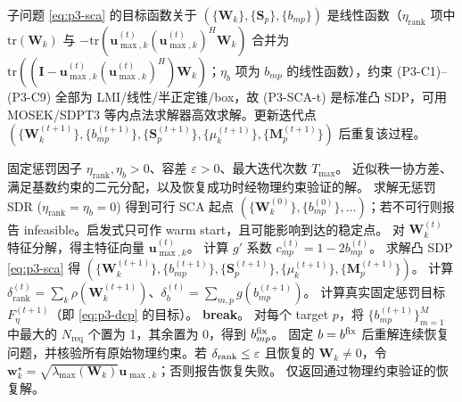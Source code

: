 \documentclass[12pt,a4paper]{article}
\newcommand{\vect}[1]{\mathbf{#1}}
\newcommand{\mat}[1]{\mathbf{#1}}
\newcommand{\tr}{\text{tr}}
\begin{document}
子问题 \eqref{eq:p3-sca} 的目标函数关于 $(\{\mat{W}_k\}, \{\mat{S}_p\}, \{b_{mp}\})$ 是线性函数（$\eta_{\text{rank}}$ 项中 $\tr(\mat{W}_k)$ 与 $-\tr(\vect{u}_{\max,k}^{(t)}(\vect{u}_{\max,k}^{(t)})^H \mat{W}_k)$ 合并为 $\tr((\mat{I} - \vect{u}_{\max,k}^{(t)}(\vect{u}_{\max,k}^{(t)})^H) \mat{W}_k)$；$\eta_b$ 项为 $b_{mp}$ 的线性函数），约束 (P3-C1)--(P3-C9) 全部为 LMI/线性/半正定锥/box，故 (P3-SCA-t) 是标准凸 SDP，可用 MOSEK/SDPT3 等内点法求解器高效求解。更新迭代点 $(\{\mat{W}_k^{(t+1)}\}, \{b_{mp}^{(t+1)}\}, \{\mat{S}_p^{(t+1)}\}, \{\mu_k^{(t+1)}\}, \{\mat{M}_p^{(t+1)}\})$ 后重复该过程。

\begin{algorithm}[htbp]
\caption{双 DC 惩罚 SCA 迭代（秩一 + 二元联合恢复）}
\label{alg:sca-joint}
\begin{algorithmic}[1]
\Require 固定惩罚因子 $\eta_{\text{rank}},\eta_b>0$、容差 $\varepsilon>0$、最大迭代次数 $T_{\max}$。
\Ensure 近似秩一协方差、满足基数约束的二元分配，以及恢复成功时经物理约束验证的解。
\State 求解无惩罚 SDR ($\eta_{\text{rank}}=\eta_b=0$) 得到可行 SCA 起点 $(\{\mat{W}_k^{(0)}\},\{b_{mp}^{(0)}\},\ldots)$；若不可行则报告 infeasible。启发式只可作 warm start，且可能影响到达的稳定点。
        \State 对 $\mat{W}_k^{(t)}$ 特征分解，得主特征向量 $\vect{u}_{\max,k}^{(t)}$。
    \EndFor
        \State 计算 $g'$ 系数 $c_{mp}^{(t)} = 1 - 2 b_{mp}^{(t)}$。
    \EndFor
    \State 求解凸 SDP \eqref{eq:p3-sca} 得 $(\{\mat{W}_k^{(t+1)}\}, \{b_{mp}^{(t+1)}\}, \{\mat{S}_p^{(t+1)}\}, \{\mu_k^{(t+1)}\}, \{\mat{M}_p^{(t+1)}\})$。
    \State 计算 $\delta_{\text{rank}}^{(t)} = \sum_k \rho(\mat{W}_k^{(t+1)})$、$\delta_b^{(t)} = \sum_{m,p} g(b_{mp}^{(t+1)})$。
    \State 计算真实固定惩罚目标 $F_\eta^{(t+1)}$（即 \eqref{eq:p3-dcp} 的目标）。
        \State \textbf{break}。
    \EndIf
\EndFor
\State 对每个 target $p$，将 $\{b_{mp}^{(t+1)}\}_{m=1}^M$ 中最大的 $N_{\text{req}}$ 个置为 1，其余置为 0，得到 $b_{mp}^{\rm fix}$。
\State 固定 $b=b^{\rm fix}$ 后重解连续恢复问题，并核验所有原始物理约束。若 $\delta_{\rm rank}\leq\varepsilon$ 且恢复的 $\mat{W}_k\neq0$，令 $\vect{w}_k^\star=\sqrt{\lambda_{\max}(\mat{W}_k)}\vect{u}_{\max,k}$；否则报告恢复失败。
\State 仅返回通过物理约束验证的恢复解。
\end{algorithmic}
\end{algorithm}
\end{document}
